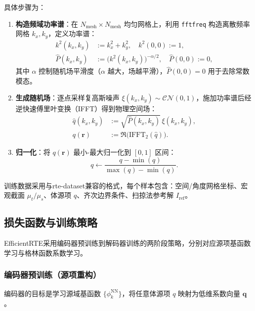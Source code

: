 具体步骤为：
\begin{enumerate}
    \item \textbf{构造频域功率谱}：在 $N_{\text{mesh}}\times N_{\text{mesh}}$ 均匀网格上，利用 \texttt{fftfreq} 构造离散频率网格 $k_x,k_y$，定义功率谱：
          \begin{align}
              k^2(k_x,k_y)         & := k_x^2 + k_y^2, \quad k^2(0,0) := 1,                                \\
              \widehat{P}(k_x,k_y) & := \bigl(k^2(k_x,k_y)\bigr)^{-\alpha/2}, \quad \widehat{P}(0,0) := 0,
          \end{align}
          其中 $\alpha$ 控制随机场平滑度（$\alpha$ 越大，场越平滑），$\widehat{P}(0,0)=0$ 用于去除常数模态。

    \item \textbf{生成随机场}：逐点采样复高斯噪声 $\xi(k_x,k_y) \sim \mathcal{CN}(0,1)$，施加功率谱后经逆快速傅里叶变换（IFFT）得到物理空间场：
          \begin{align}
              \widehat{q}(k_x,k_y) & := \sqrt{\widehat{P}(k_x,k_y)}\,\xi(k_x,k_y),   \\
              q(\boldsymbol{r})    & := \Re\bigl(\mathrm{IFFT}_2(\widehat{q})\bigr).
          \end{align}

    \item \textbf{归一化}：将 $q(\boldsymbol{r})$ 最小-最大归一化到 $[0,1]$ 区间：
          \begin{equation}
              q \leftarrow \frac{q-\min(q)}{\max(q)-\min(q)}.
          \end{equation}
\end{enumerate}

训练数据采用与rte-dataset兼容的格式，每个样本包含：空间/角度网格坐标、宏观截面 $\mu_t/\mu_s$、体源项 $q$、齐次边界条件、扫掠法参考解 $I_{\text{ref}}$。

\subsection{损失函数与训练策略}

EfficientRTE采用编码器预训练到解码器训练的两阶段策略，分别对应源项基函数学习与格林函数系数学习。

\subsubsection{编码器预训练（源项重构）}
编码器的目标是学习源域基函数 $\{\phi_k^{\text{NN}}\}$，将任意体源项 $q$ 映射为低维系数向量 $\boldsymbol{q}$。

